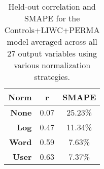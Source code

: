 \begin{table}[t]
\centering
\begin{tabular}{|r|c|c|}
\hline
                    {\bf Norm}	& {\bf r}	& {\bf SMAPE}\\
\hline
                    {\bf None}	& 0.07 	& 25.23\%\\
                     {\bf Log}	& 0.47 	& 11.34\%\\
                    {\bf Word}	& 0.59 	& 7.63\%\\
                    {\bf User}	& 0.63 	& 7.37\%\\
\hline
\end{tabular}
\caption{Held-out correlation and SMAPE for the Controls+LIWC+PERMA model averaged across all 27 output variables using various normalization strategies. \label{tab.norm}}
\end{table}
